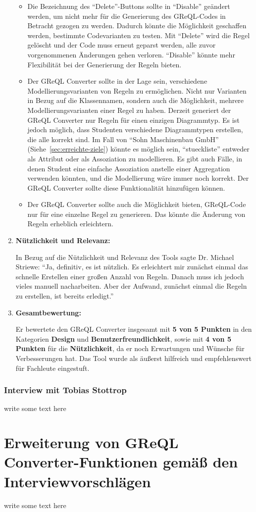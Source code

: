 \begin{enumerate}[itemsep=8pt, parsep=5pt]
    \begin{itemize}[itemsep=8pt, parsep=5pt]
        \item Die Bezeichnung des ``Delete''-Buttons sollte in ``Disable'' geändert werden, um nicht mehr für die
        Generierung des GReQL-Codes in Betracht gezogen zu werden. Dadurch könnte die Möglichkeit geschaffen werden,
        bestimmte Codevarianten zu testen. Mit ``Delete'' wird die Regel gelöscht und der Code muss erneut geparst
        werden, alle zuvor vorgenommenen Änderungen gehen verloren. ``Disable'' könnte mehr Flexibilität bei der
        Generierung der Regeln bieten.
        \item Der GReQL Converter sollte in der Lage sein, verschiedene Modellierungsvarianten von Regeln zu
        ermöglichen. Nicht nur Varianten in Bezug auf die Klassennamen, sondern auch die Möglichkeit, mehrere
        Modellierungsvarianten einer Regel zu haben. Derzeit generiert der GReQL Converter nur Regeln für einen
        einzigen Diagrammtyp. Es ist jedoch möglich, dass Studenten verschiedene Diagrammtypen erstellen, die alle
        korrekt sind. Im Fall von ``Sohn Maschinenbau GmbH'' (Siehe~\ref{sec:erreichte-ziele}) könnte es möglich sein,
        ``stueckliste'' entweder als Attribut oder als Assoziation zu modellieren. Es gibt auch Fälle, in denen Student
        eine einfache Assoziation anstelle einer Aggregation verwenden könnten, und die Modellierung wäre immer noch
        korrekt. Der GReQL Converter sollte diese Funktionalität hinzufügen können.
        \item Der GReQL Converter sollte auch die Möglichkeit bieten, GReQL-Code nur für eine einzelne Regel zu
        generieren. Das könnte die Änderung von Regeln erheblich erleichtern.
    \end{itemize}

    \item \textbf{Nützlichkeit und Relevanz:}

    In Bezug auf die Nützlichkeit und Relevanz des Tools sagte Dr. Michael Striewe: ``Ja, definitiv, es ist nützlich.
    Es erleichtert mir zunächst einmal das schnelle Erstellen einer großen Anzahl von Regeln. Danach muss ich jedoch
    vieles manuell nacharbeiten. Aber der Aufwand, zunächst einmal die Regeln zu erstellen, ist bereits erledigt.''


    \item \textbf{Gesamtbewertung:}

    Er bewertete den GReQL Converter insgesamt mit \textbf{5 von 5 Punkten} in den Kategorien \textbf{Design} und
    \textbf{Benutzerfreundlichkeit}, sowie mit \textbf{4 von 5 Punkten} für die \textbf{Nützlichkeit}, da er noch
    Erwartungen und Wünsche für Verbesserungen hat. Das Tool wurde als äußerst hilfreich und empfehlenswert
    für Fachleute eingestuft.

\end{enumerate}

\subsubsection{Interview mit Tobias Stottrop}
write some text here

\section{Erweiterung von GReQL Converter-Funktionen gemäß den Interviewvorschlägen}
write some text here

